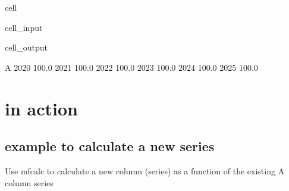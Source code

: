 \documentclass[letterpaper,10pt,english]{jupyterBook}
\begin{document}
\begin{sphinxuseclass}{cell}\begin{sphinxVerbatimInput}

\begin{sphinxuseclass}{cell_input}
\begin{sphinxVerbatim}[commandchars=\\\{\}]
                                   
                                               
    \PYG{p}{[}    \PYG{p}{]}           
    \PYG{p}{[}\PYG{p}{]}                                  
   
\end{sphinxVerbatim}

\end{sphinxuseclass}\end{sphinxVerbatimInput}
\begin{sphinxVerbatimOutput}

\begin{sphinxuseclass}{cell_output}
\begin{sphinxVerbatim}[commandchars=\\\{\}]
          A
2020  100.0
2021  100.0
2022  100.0
2023  100.0
2024  100.0
2025  100.0
\end{sphinxVerbatim}

\end{sphinxuseclass}\end{sphinxVerbatimOutput}

\end{sphinxuseclass}

\section{ in action}
\label{\detokenize{content/04_PythonEssentials/ExtendingDataFrames:mfcalc-in-action}}

\subsection{ example to calculate a new series}
\label{\detokenize{content/04_PythonEssentials/ExtendingDataFrames:mfcalc-example-to-calculate-a-new-series}}
\sphinxAtStartPar
Use  mfcalc to calculate a new column (series) as a function of the existing A column series
\end{document}
